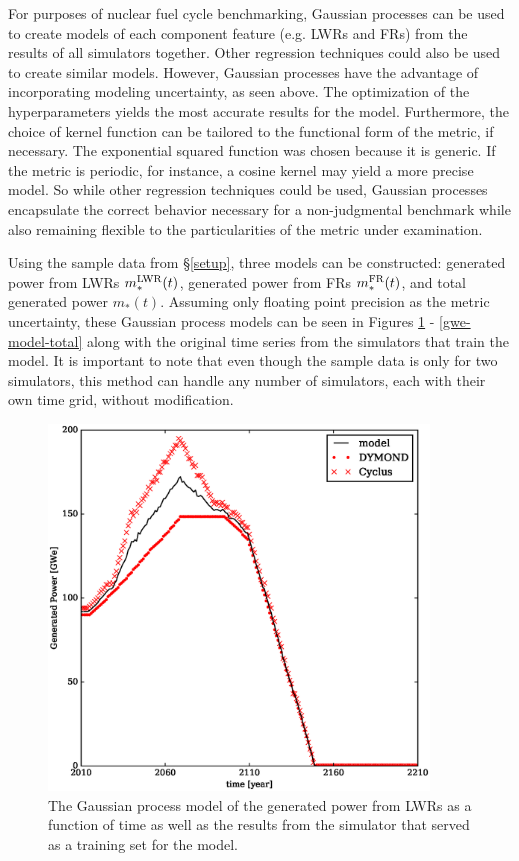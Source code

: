 For purposes of nuclear fuel cycle benchmarking, Gaussian processes can be used to
create models of each component feature (e.g. LWRs and FRs) from the 
results of all simulators together. Other regression techniques could also be used 
to create similar models.  However, Gaussian processes have the advantage of 
incorporating modeling uncertainty, as seen above. The optimization of the 
hyperparameters yields the most accurate results for the model. Furthermore, the 
choice of kernel function can be tailored to the functional form of the metric, if 
necessary. The exponential squared function was chosen because it is generic. If the 
metric is periodic, for instance, a cosine kernel may yield a more precise model. 
So while other regression techniques could be used, Gaussian processes 
encapsulate the correct behavior necessary for a non-judgmental benchmark while 
also remaining flexible to the particularities of the metric under examination.

Using the sample data from \S\ref{setup}, three models can be constructed:
generated power from LWRs $m_*^{\mathrm{LWR}}(t)$, generated power from FRs $m_*^{\mathrm{FR}}(t)$, 
and total generated power $m_*(t)$. Assuming only floating point precision as 
the metric uncertainty, these Gaussian process models can be seen in Figures 
\ref{gwe-model-lwr} - \ref{gwe-model-total} along with the original time series 
from the simulators that train the model.
It is important to note that even though the sample data is only for two simulators, 
this method can handle any number of simulators, each with their own time grid, 
without modification.

\begin{figure}[htb]
\centering
\includegraphics[width=0.9\textwidth]{gwe-model-lwr.eps}
\caption{The Gaussian process model of the generated power from LWRs
as a function of time as well as the results from the simulator that served as a 
training set for the model.}
\label{gwe-model-lwr}
\end{figure}


